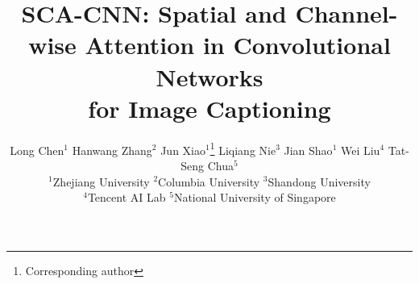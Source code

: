 \documentclass[10pt,twocolumn,letterpaper]{article}
\begin{document}
\title{SCA-CNN: Spatial and Channel-wise Attention in Convolutional Networks \\ for Image Captioning}
\author{Long Chen$^{1}$ \; Hanwang Zhang$^{2}$ \; Jun Xiao$^{1}$\thanks{Corresponding author} \; Liqiang Nie$^{3}$ \;
Jian Shao$^{1}$ \; Wei Liu$^{4}$ \; Tat-Seng Chua$^{5}$ \\
$^{1}$Zhejiang University \quad $^{2}$Columbia University \quad $^{3}$Shandong University \\
$^{4}$Tencent AI Lab \quad $^{5}$National University of Singapore \\
}



\maketitle
\thispagestyle{empty}
\end{document}

